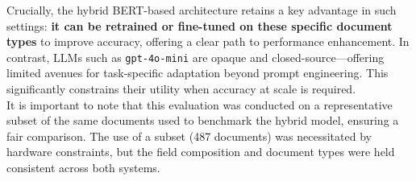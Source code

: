 \documentclass{article}
\begin{document}
Crucially, the hybrid BERT-based architecture retains a key advantage in such settings: \textbf{it can be retrained or fine-tuned on these specific document types} to improve accuracy, offering a clear path to performance enhancement. In contrast, LLMs such as \texttt{gpt-4o-mini} are opaque and closed-source—offering limited avenues for task-specific adaptation beyond prompt engineering. This significantly constrains their utility when accuracy at scale is required. \\

It is important to note that this evaluation was conducted on a representative subset of the same documents used to benchmark the hybrid model, ensuring a fair comparison. The use of a subset (487 documents) was necessitated by hardware constraints, but the field composition and document types were held consistent across both systems.


 

\end{document}
